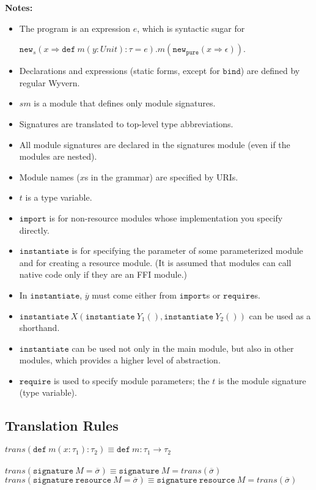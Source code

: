 \documentclass{llncs}
\newcommand{\keywadj}[1]{\mathtt{#1}}
\newcommand{\keyw}[1]{\keywadj{#1}~}
\begin{document}
\noindent\textbf{Notes:}
\begin{itemize}
\item The program is an expression $e$, which is syntactic sugar for

$\keywadj{new}_s(x \Rightarrow \keyw{def} m(y : Unit) : \tau = e).m(\keywadj{new}_{\keywadj{pure}}(x \Rightarrow \epsilon))$.
\item Declarations and expressions (static forms, except for $\keywadj{bind}$) are defined by regular Wyvern.
\item $sm$ is a module that defines only module signatures.
\item Signatures are translated to top-level type abbreviations.
\item All module signatures are declared in the signatures module (even if the modules are nested).
\item Module names ($x$s in the grammar) are specified by URIs.
\item $t$ is a type variable.
\item $\keywadj{import}$ is for non-resource modules whose implementation you specify directly.
\item $\keywadj{instantiate}$ is for specifying the parameter of some parameterized module and for creating a resource module. (It is assumed that modules can call native code only if they are an FFI module.)
\item In $\keywadj{instantiate}$, $\overline{y}$ must come either from $\keywadj{import}$s or $\keywadj{require}$s.
\item $\keyw{instantiate} X(\keyw{instantiate} Y_1(), \keyw{instantiate} Y_2())$ can be used as a shorthand.
\item $\keywadj{instantiate}$ can be used not only in the main module, but also in other modules, which provides a higher level of abstraction.
\item $\keywadj{require}$ is used to specify module parameters; the $t$ is the module signature (type variable).

\end{itemize}


\newpage

\subsection{Translation Rules}

$\textit{trans}(\keyw{def} m(x : \tau_1) : \tau_2) \equiv \keyw{def} m : \tau_1 \rightarrow \tau_2$\\
\\
$\textit{trans}(\keyw{signature} M = \overline{\sigma}) \equiv \keyw{signature} M = trans(\overline{\sigma})$ \\
$\textit{trans}(\keyw{signature} \keyw{resource} M = \overline{\sigma}) \equiv \keyw{signature} \keyw{resource} M = trans(\overline{\sigma})$ \\
\end{document}
